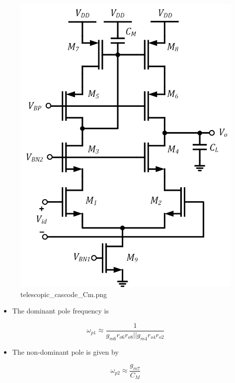 \documentclass[11pt]{article}
\providecommand{\tightlist}{%
      \setlength{\itemsep}{0pt}\setlength{\parskip}{0pt}}
\begin{document}
    \begin{figure}
\centering
\includegraphics{telescopic_cascode_Cm.png}
\caption{telescopic\_cascode\_Cm.png}
\end{figure}

    \begin{itemize}
\tightlist
\item
  The dominant pole frequency is
\end{itemize}

\begin{equation}
\omega_{p1} \approx \dfrac{1}{g_{m6}r_{o6}r_{o8}||g_{m4}r_{o4}r_{o2}}
\end{equation}

\begin{itemize}
\tightlist
\item
  The non-dominant pole is given by
\end{itemize}

\begin{equation}
\omega_{p2} \approx \dfrac{g_{m7}}{C_M}
\end{equation}
\end{document}
